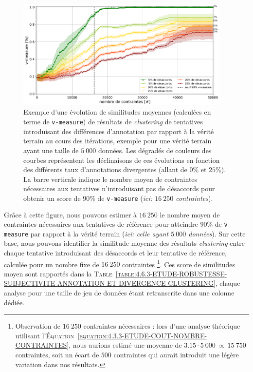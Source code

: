 			\begin{figure}[!htb]
				\centering
				\includegraphics[width=0.95\textwidth]{figures/etude-robustesse-subjectivite-et-difference-5000}
				\caption{
					Exemple d'une évolution de similitudes moyennes (calculées en terme de \texttt{v-measure}) de résultats de \textit{clustering} de tentatives introduisant des différences d'annotation par rapport à la vérité terrain au cours des itérations, exemple pour une vérité terrain ayant une taille de $5~000$ données.
					Les dégradés de couleurs des courbes représentent les déclinaisons de ces évolutions en fonction des différents taux d'annotations divergentes (allant de $0$\% et $25$\%).
					La barre verticale indique le nombre moyen de contraintes nécessaires aux tentatives n'introduisant pas de désaccords pour obtenir un score de $90$\% de \texttt{v-measure} (\textit{ici: $16~250$ contraintes}).
				}
				\label{figure:4.6.3-ETUDE-ROBUSTESSE-SUBJECTIVITE-ANNOTATION-ET-DIVERGENCE-5000}
			\end{figure}
			
			Grâce à cette figure, nous pouvons estimer à $16~250$ le nombre moyen de contraintes nécessaires aux tentatives de référence pour atteindre $90$\% de \texttt{v-measure} par rapport à la vérité terrain (\textit{ici: celle ayant $5~000$ données}).
			Sur cette base, nous pouvons identifier la similitude moyenne des résultats \textit{clustering} entre chaque tentative introduisant des désaccords et leur tentative de référence, calculée pour un nombre fixe de $16~250$ contraintes \footnote{
				Observation de $16~250$ contraintes nécessaires : lors d'une analyse théorique utilisant l'\textsc{Équation~\ref{equation:4.3.3-ETUDE-COUT-NOMBRE-CONTRAINTES}}, nous aurions estimé une moyenne de $3.15 \cdot 5~000~\propto~15~750$ contraintes, soit un écart de $500$ contraintes qui aurait introduit une légère variation dans nos résultats.
			}.
			Ces score de similitudes moyen sont rapportés dans la \textsc{Table~\ref{table:4.6.3-ETUDE-ROBUSTESSE-SUBJECTIVITE-ANNOTATION-ET-DIVERGENCE-CLUSTERING}}, chaque analyse pour une taille de jeu de données étant retranscrite dans une colonne dédiée.
			
